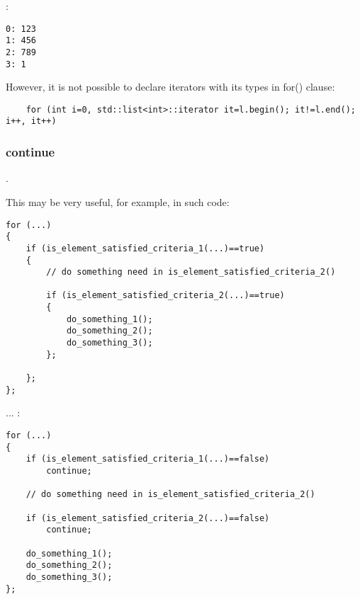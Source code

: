 

:

\begin{lstlisting}
0: 123
1: 456
2: 789
3: 1
\end{lstlisting}

{However, it is not possible to declare iterators with its types in for() clause}:

\begin{lstlisting}
	for (int i=0, std::list<int>::iterator it=l.begin(); it!=l.end(); i++, it++)
\end{lstlisting}

\subsubsection{continue}

 .

{This may be very useful, for example, in such code}:

\begin{lstlisting}
for (...)
{
	if (is_element_satisfied_criteria_1(...)==true)
	{
		// do something need in is_element_satisfied_criteria_2()

		if (is_element_satisfied_criteria_2(...)==true)
		{
			do_something_1();
			do_something_2();
			do_something_3();
		};

	};
};
\end{lstlisting}

... :

\begin{lstlisting}
for (...)
{
	if (is_element_satisfied_criteria_1(...)==false)
		continue;

	// do something need in is_element_satisfied_criteria_2()

	if (is_element_satisfied_criteria_2(...)==false)
		continue;

	do_something_1();
	do_something_2();
	do_something_3();
};
\end{lstlisting}

